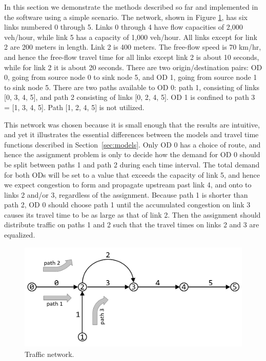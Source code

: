 In this section we demonstrate the methods described so far and implemented in the software using a simple scenario. The network, shown in Figure \ref{fig:config}, has six links numbered 0 through 5. Links 0 through 4 have flow capacities of 2,000 veh/hour, while link 5 has a capacity of 1,000 veh/hour. All links except for link 2 are 200 meters in length. Link 2 is 400 meters. The free-flow speed is 70 km/hr, and hence the free-flow travel time for all links except link 2 is about 10 seconds, while for link 2 it is about 20 seconds. There are two origin/destination pairs: OD 0, going from source node 0 to sink node 5, and OD 1, going from source node 1 to sink node 5. There are two paths available to OD 0: path 1, consisting of links [0, 3, 4, 5], and path 2 consisting of links [0, 2, 4, 5]. OD 1 is confined to path 3 = [1, 3, 4, 5]. Path [1, 2, 4, 5] is not utilized.

This network was chosen because it is small enough that the results are intuitive, and yet it illustrates the essential differences between the models and travel time functions described in Section~\ref{sec:models}. Only OD 0 has a choice of route, and hence the assignment problem is only to decide how the demand for OD 0 should be split between paths 1 and path 2 during each time interval. The total demand for both ODs will be set to a value that exceeds the capacity of link 5, and hence we expect congestion to form and propagate upstream past link 4, and onto to links 2 and/or 3, regardless of the assignment. Because path 1 is shorter than path 2, OD 0 should choose path 1 until the accumulated congestion on link 3 causes its travel time to be as large as that of link 2. Then the assignment should distribute traffic on paths 1 and 2 such that the travel times on links 2 and 3 are equalized. 

\begin{figure}[htbp]
    \centering
    \includegraphics[width=0.9\linewidth]{figs/config.png}
    \caption{Traffic network.}
    \label{fig:config}
\end{figure}

